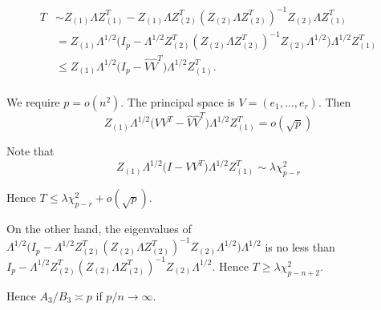 \documentclass[review]{elsarticle}
\theoremstyle{plain}
\theoremstyle{definition}
\theoremstyle{remark}
\begin{document}
\begin{equation}
    \begin{aligned}
        T&\sim Z_{(1)}\Lambda Z_{(1)}^T-Z_{(1)}\Lambda Z_{(2)}^T{(Z_{(2)}\Lambda Z_{(2)}^T)}^{-1}Z_{(2)}\Lambda Z_{(1)}^T\\
        &=Z_{(1)}\Lambda^{1/2}\big(I_p -\Lambda^{1/2} Z_{(2)}^T{(Z_{(2)}\Lambda Z_{(2)}^T)}^{-1}Z_{(2)}\Lambda^{1/2} \big)\Lambda^{1/2}Z_{(1)}^T\\
        &\leq Z_{(1)}\Lambda^{1/2}\big(I_p -\hat{V}\hat{V}^T\big)\Lambda^{1/2}Z_{(1)}^T.\\
    \end{aligned}
\end{equation}

We require $p=o(n^2)$. The principal space is $V=(e_1,\ldots, e_r)$. Then 
\begin{equation}
    Z_{(1)}\Lambda^{1/2}\big(VV^T -\hat{V}\hat{V}^T\big)\Lambda^{1/2}Z_{(1)}^T=o(\sqrt{p})
\end{equation}

Note that
\begin{equation}
    Z_{(1)}\Lambda^{1/2}\big (I-VV^T) \Lambda^{1/2}Z_{(1)}^T\sim\lambda \chi^2_{p-r}
\end{equation}

Hence $T\leq \lambda\chi^2_{p-r}+o(\sqrt{p})$.

On the other hand, the eigenvalues of $\Lambda^{1/2}\big(I_p -\Lambda^{1/2} Z_{(2)}^T{(Z_{(2)}\Lambda Z_{(2)}^T)}^{-1}Z_{(2)}\Lambda^{1/2} \big)\Lambda^{1/2}$ is no less than $I_p -\Lambda^{1/2} Z_{(2)}^T{(Z_{(2)}\Lambda Z_{(2)}^T)}^{-1}Z_{(2)}\Lambda^{1/2}$. Hence $T\geq \lambda \chi^2_{p-n+2}$.

Hence $A_3/B_3\asymp p$ if $p/n\to \infty$.


\end{document}
